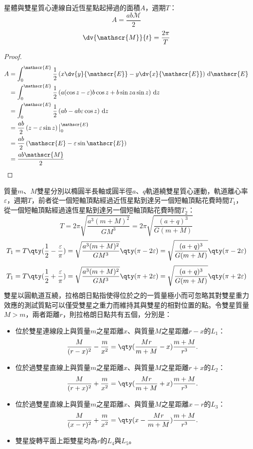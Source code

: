 \documentclass[a4paper,12pt]{article}
\begin{document}
星體與雙星質心連線自近恆星點起掃過的面積$A$，週期$T$：
\[A=\frac{ab\mathscr{M}}{2}\]
\[\dv{\mathscr{M}}{t}=\frac{2\pi}{T}\]
\begin{proof}
\[\begin{aligned}
A&=\int_0^{\mathscr{E}}\frac{1}{2}\left(x\dv{y}{\mathscr{E}}-y\dv{x}{\mathscr{E}}\right)\,\mathrm{d}\mathscr{E}\\
&=\int_0^{\mathscr{E}}\frac{1}{2}\left(a(\cos z-\varepsilon)b\cos z+b\sin za\sin z\right)\,\mathrm{d}z\\
&=\int_0^{\mathscr{E}}\frac{1}{2}\left(ab-ab\varepsilon\cos z\right)\,\mathrm{d}z\\
&=\frac{ab}{2}\left(z-\varepsilon\sin z\right)\big\vert_0^{\mathscr{E}}\\
&=\frac{ab}{2}\left(\mathscr{E}-\varepsilon\sin\mathscr{E}\right)\\
&=\frac{ab\mathscr{M}}{2}
\end{aligned}\]
\end{proof}
質量$m$、$M$雙星分別以橢圓半長軸或圓半徑$a$、$q$軌道繞雙星質心運動，軌道離心率$\varepsilon$，週期$T$，前者從一個短軸頂點經過近恆星點到達另一個短軸頂點花費時間$T_1$，從一個短軸頂點經過遠恆星點到達另一個短軸頂點花費時間$T_2$：
\[T=2\pi\sqrt{\frac{a^3(m+M)^2}{GM^3}}=2\pi\sqrt{\frac{(a+q)^3}{G(m+M)}}\]
\[T_1=T\qty(\frac{1}{2}-\frac{\varepsilon}{\pi})=\sqrt{\frac{a^3(m+M)^2}{GM^3}}\qty(\pi-2\varepsilon)=\sqrt{\frac{(a+q)^3}{G(m+M)}}\qty(\pi-2\varepsilon)\]
\[T_1=T\qty(\frac{1}{2}+\frac{\varepsilon}{\pi})=\sqrt{\frac{a^3(m+M)^2}{GM^3}}\qty(\pi+2\varepsilon)=\sqrt{\frac{(a+q)^3}{G(m+M)}}\qty(\pi+2\varepsilon)\]
雙星以圓軌道互繞，拉格朗日點指使得位於之的一質量極小而可忽略其對雙星重力效應的測試質點可以僅受雙星之重力而維持其與雙星的相對位置的點。令雙星質量$M>m$，兩者距離$r$，則拉格朗日點共有五個，分別是：
\begin{itemize}
\item 位於雙星連線段上與質量$m$之星距離$x$、與質量$M$之星距離$r-x$的$L_1$：
\[\frac{M}{(r-x)^2}-\frac{m}{x^2}=\qty(\frac{Mr}{m+M}-x)\frac{m+M}{r^3}.\]
\item 位於過雙星直線上與質量$m$之星距離$x$、與質量$M$之星距離$r+x$的$L_2$：
\[\frac{M}{(r+x)^2}+\frac{m}{x^2}=\qty(\frac{Mr}{m+M}+x)\frac{m+M}{r^3}.\]
\item 位於過雙星直線上與質量$m$之星距離$x$、與質量$M$之星距離$x-r$的$L_3$：
\[\frac{M}{(x-r)^2}+\frac{m}{x^2}=\qty(x-\frac{Mr}{m+M})\frac{m+M}{r^3}.\]
\item 雙星旋轉平面上距雙星均為$r$的$L_4$與$L_5$。
\end{itemize}
\end{document}
